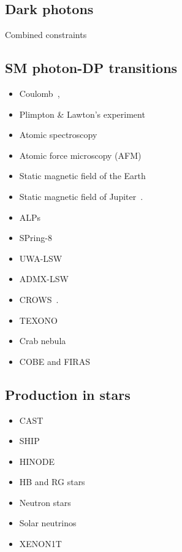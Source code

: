 \documentclass[9pt,twocolumn]{extarticle}
\begin{document}
\begin{mdframed}
\section{Dark photons}\vspace{-0.5em}
Combined constraints~\cite{Caputo:2021eaa}
\subsection*{SM photon-DP transitions}\vspace{-0.5em}
\begin{itemize}\setlength\itemsep{-0.5em}
\item Coulomb~\cite{Goldhaber:2008xy,Williams:1971ms,Bartlett:1988yy,Tu:2005ge,Kroff:2020zhp},
\item Plimpton \& Lawton's experiment~\cite{Plimpton:1936ont,Kroff:2020zhp}
\item Atomic spectroscopy~\cite{Jaeckel:2010xx}
\item Atomic force microscopy (AFM)~\cite{Kroff:2020zhp}
\item Static magnetic field of the Earth~\cite{Goldhaber:1971mr,Fischbach:1994ir,Marocco:2021dku}
\item Static magnetic field of Jupiter~\cite{Davis:1975mn,Marocco:2021dku}. 
\item ALPs~\cite{Ehret:2010mh}
\item SPring-8~\cite{Inada:2013tx}
\item UWA-LSW~\cite{Povey:2010hs,Parker:2013fxa}
\item ADMX-LSW~\cite{Wagner:2010mi}
\item CROWS~\cite{Betz:2013dza}.
\item TEXONO~\cite{Danilov:2018bks}
\item Crab nebula~\cite{Zechlin:2008tj}
\item COBE and FIRAS~\cite{Caputo:2020bdy}
\end{itemize}

\subsection*{Production in stars}\vspace{-0.5em}
\begin{itemize}\setlength\itemsep{-0.5em}
\item CAST~\cite{Redondo:2008aa}
\item SHIP~\cite{Schwarz:2015lqa} 
\item HINODE~\cite{Frerick:2022mjg}
\item HB and RG stars~\cite{Redondo:2013lna}
\item Neutron stars~\cite{Hong:2020bxo}
\item Solar neutrinos~\cite{Vinyoles:2015aba}
\item XENON1T~\cite{XENON:2021myl}
\end{itemize}


\end{mdframed}
\end{document}
